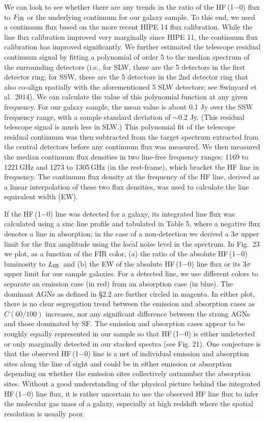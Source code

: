\documentclass[preprint]{aastex}
\newcommand{\etal}{et al.~}
\newcommand{\LIR}{\mbox{$L_{\rm IR}$}}
\begin{document}
We can look to see whether there are any trends in the ratio of the HF\,(1$-$0) flux to 
$F_{\rm IR}$ or the underlying continuum for our galaxy sample.  To this end, we used 
a continuum flux based on the more recent
HIPE 14 flux calibration.  While the line flux calibration improved very marginally since
HIPE 11, the continuum flux calibration has improved significantly.  We further 
estimated the telescope residual continuum signal by fitting a polynomial of order 5 to 
the median 
spectrum of the surrounding detectors (i.e., for SLW, these are the 5 detectors in the first 
detector ring;  for SSW, these are the 5 detectors in the 2nd detector ring that also 
co-align spatially with the aforementioned 5 SLW detectors; see Swinyard \etal 2014).  
We can calculate the value of this polynomial function at any given frequency. For our galaxy 
sample, the mean value is about 0.1 Jy over the SSW frequency range, with a sample standard 
deviation of $\sim$0.2 Jy. (This residual telescope signal is much less  in SLW.)
This polynomial fit of the telescope residual continuum was
then subtracted from the target spectrum extracted from the central detectors before any 
continuum flux was measured.  We then measured the median continuum flux densities in 
two line-free frequency ranges: 1169 to 1221\,GHz and 1273 to 1305\,GHz (in the rest-frame),
which bracket the HF line in frequency.  The continuum flux density at the frequency of 
the HF line, derived as a linear interpolation of these two flux densities, was used to 
calculate the line equivalent width (EW).


If the HF\,(1$-$0) line was detected for a galaxy, its integrated line flux was calculated 
using a sinc line profile and tabulated in Table 5, where a negative flux denotes a line in 
absorption; in the case of a non-detection we derived a 3$\sigma$ upper limit for 
the flux amplitude using the local noise level in the spectrum. 
In Fig.~23 we plot, as a function of the FIR color,  
(a) the ratio of the absolute HF\,(1$-$0) luminosity to \LIR\ and (b) the EW of 
the absolute HF\,(1$-$0) line flux or its 3$\sigma$ upper limit for our sample galaxies. 
For a detected line, we use different colors to separate an emission case 
(in red) from an absorption case (in blue).  The dominant AGNs as defined in \S2.2 
are further circled in 
magenta.  In either plot, there is no clear segregation trend between the emission and
absorption cases as $C(60/100)$ increases, nor any significant difference between 
the strong AGNs and those dominated by SF.  The emission and absorption cases appear
to be roughly equally represented in our sample so that HF\,(1$-$0) is either undetected 
or only marginally detected in our stacked spectra (see Fig. 21).   One conjecture is 
that the observed HF\,(1$-$0) line is a net of individual emission and absorption sites 
along the line of sight and could be in either emission or absorption depending on 
whether the emission sites collectively outnumber the absorption sites.   Without a 
good understanding of the physical picture behind the integrated HF\,(1$-$0) line flux, 
it is rather uncertain to use the observed HF line flux to infer the molecular gas mass
of a galaxy, especially at high redshift where the spatial resolution is usually poor.
\end{document}
